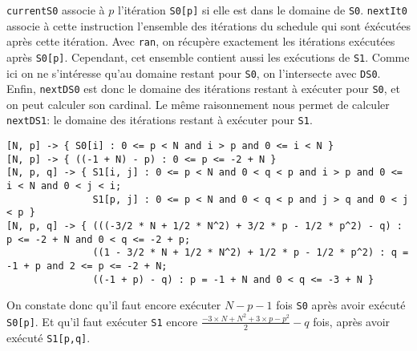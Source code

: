 \documentclass{article}
\begin{document}
\lstinline{currentS0} associe à $p$ l'itération \lstinline{S0[p]} si elle est dans le domaine de \lstinline{S0}.
\lstinline{nextIt0} associe à cette instruction l'ensemble des itérations du schedule qui sont éxécutées après cette itération. Avec \lstinline{ran}, on récupère exactement les itérations exécutées après \lstinline{S0[p]}.
Cependant, cet ensemble contient aussi les exécutions de \lstinline{S1}. Comme ici on ne s'intéresse qu'au domaine restant pour \lstinline{S0}, on l'intersecte avec \lstinline{DS0}.
Enfin, \lstinline{nextDS0} est donc le domaine des itérations restant à exécuter pour \lstinline{S0}, et on peut calculer son cardinal.
Le même raisonnement nous permet de calculer \lstinline{nextDS1}: le domaine des itérations restant à exécuter pour \lstinline{S1}.

\begin{lstlisting}
[N, p] -> { S0[i] : 0 <= p < N and i > p and 0 <= i < N }
[N, p] -> { ((-1 + N) - p) : 0 <= p <= -2 + N }
[N, p, q] -> { S1[i, j] : 0 <= p < N and 0 < q < p and i > p and 0 <= i < N and 0 < j < i;
               S1[p, j] : 0 <= p < N and 0 < q < p and j > q and 0 < j < p }
[N, p, q] -> { (((-3/2 * N + 1/2 * N^2) + 3/2 * p - 1/2 * p^2) - q) : p <= -2 + N and 0 < q <= -2 + p;
               ((1 - 3/2 * N + 1/2 * N^2) + 1/2 * p - 1/2 * p^2) : q = -1 + p and 2 <= p <= -2 + N;
               ((-1 + p) - q) : p = -1 + N and 0 < q <= -3 + N }
\end{lstlisting}

On constate donc qu'il faut encore exécuter $N-p-1$ fois \lstinline{S0} après avoir exécuté \lstinline{S0[p]}.
Et qu'il faut exécuter \lstinline{S1} encore $\frac{-3\times N + N^2 + 3\times p - p^2}{2} -q$ fois, après avoir exécuté \lstinline{S1[p,q]}.
\end{document}

